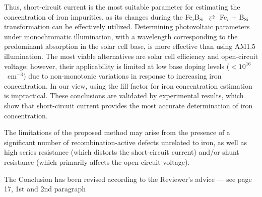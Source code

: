 \documentclass[a4paper,fleqn]{cas-sc}
\begin{document}
Thus, short-circuit current is the most suitable parameter for estimating the concentration of iron impurities, as its changes during the
Fe$_i$B$_\mathrm{Si}$ $\rightleftarrows$ Fe$_i$ + B$_\mathrm{Si}$ transformation can be effectively utilized.
Determining photovoltaic parameters under monochromatic illumination,
with a wavelength corresponding to the predominant absorption in the solar cell base, is more effective than using AM1.5 illumination.
The most viable alternatives are solar cell efficiency and open-circuit voltage;
however, their applicability is limited at low base doping levels ($<10^{16}$~cm$^{-3}$)
due to non-monotonic variations in response to increasing iron concentration.
In our view, using the fill factor for iron concentration estimation is impractical.
These conclusions are validated by experimental results, which show that short-circuit current provides the most accurate determination of iron concentration.

The limitations of the proposed method may arise from the presence of a significant
number of recombination-active defects unrelated to iron,
as well as high series resistance (which distorts the short-circuit current) and/or shunt resistance (which primarily affects the open-circuit voltage).

The Conclusion has been revised according to the Reviewer's advice --- see page 17, 1st and 2nd paragraph
\end{document}
